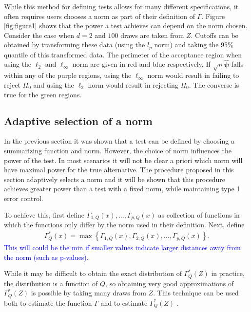 \documentclass{article}
\newcommand{\norm}{f}
\newcommand{\rvv}{Z}
\newcommand{\distv}{Q}
\begin{document}
While this method for defining tests allows for many different specifications, it often requires users chooses a norm as part of their definition of $\Gamma$.  Figure \ref{fig:figure1} shows that the power a test achieves can depend on the norm chosen.  Consider the case when $d = 2$ and $100$ draws are taken from $Z$.  Cutoffs can be obtained by transforming these data (using the $l_p$ norm) and taking the 95\% quantile of this transformed data. The perimeter of the acceptance region when using the $\ell_2$ and $\ell_{\infty}$ norm are given in red and blue respectively. If $\sqrt{n}\hat{\boldsymbol{\psi}}$ falls within any of the purple regions, using the $\ell_\infty$ norm would result in failing to reject $H_0$ and using the $\ell_2$ norm would result in rejecting $H_0$.  The converse is true for the green regions.  

\subsection{Adaptive selection of a norm}
In the previous section it was shown that a test can be defined by choosing a summarizing function and norm. However, the choice of norm influences the power of the test. In most scenarios it will not be clear a priori which norm will have maximal power for the true alternative. The procedure proposed in this section adaptively selects a norm and it will be shown that this procedure achieves greater power than a test with a fixed norm, while maintaining type 1 error control.  

To achieve this, first define $\Gamma_{1, \distv}(x), \dots, \Gamma_{p, \distv}(x)$ as collection of functions in which the functions only differ by the norm used in their definition. Next, define
\begin{align*}
	\Gamma^*_\distv(x) = \max\left\{\Gamma_{1, \distv}(x), \Gamma_{2, \distv}(x), \dots, \Gamma_{p, \distv}(x)\right\}.
\end{align*}
\textcolor{blue}{This will could be the min if smaller values indicate larger distances away from the norm (such as p-values).}  

While it may be difficult to obtain the exact distribution of $\Gamma_\distv^*(\rvv)$ in practice, the distribution is a function of $\distv$, so obtaining very good approximations of $\Gamma_\distv^*(\rvv)$ is possible by taking many draws from $\rvv$. This technique can be used both to estimate the function $\Gamma$ and to estimate $\Gamma^*_\distv(\rvv)$ .
\end{document}
